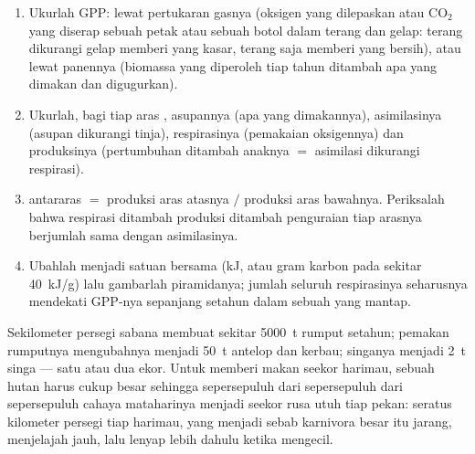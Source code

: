 \begin{method}\label{met:b1:ecosystem-organization:budget}
\begin{enumerate}
  \item Ukurlah GPP: lewat pertukaran gasnya (oksigen yang dilepaskan
        atau $\mathrm{CO_2}$ yang diserap sebuah petak atau sebuah
        botol dalam terang dan gelap: terang dikurangi gelap memberi
        yang kasar, terang saja memberi yang bersih), atau lewat
        panennya (biomassa yang diperoleh tiap tahun ditambah apa yang
        dimakan dan digugurkan).
  \item Ukurlah, bagi tiap aras , asupannya (apa yang
        dimakannya), asimilasinya (asupan dikurangi tinja),
        respirasinya (pemakaian oksigennya) dan produksinya
        (pertumbuhan ditambah anaknya $=$ asimilasi dikurangi
        respirasi).
  \item {} antararas $=$ produksi aras atasnya $/$
        produksi aras bawahnya. Periksalah bahwa respirasi ditambah
        produksi ditambah penguraian tiap arasnya berjumlah sama dengan
        asimilasinya.
  \item Ubahlah menjadi satuan bersama (\unit{kJ}, atau gram karbon
        pada sekitar \qty{40}{kJ/g}) lalu gambarlah piramidanya; jumlah
        seluruh respirasinya seharusnya mendekati GPP-nya sepanjang
        setahun dalam sebuah  yang mantap.
\end{enumerate}
\end{method}

\begin{example}\label{ex:b1:ecosystem-organization:top}
Sekilometer persegi sabana membuat sekitar \qty{5000}{t} rumput
setahun; pemakan rumputnya mengubahnya menjadi \qty{50}{t} antelop dan
kerbau; singanya menjadi \qty{2}{t} singa --- satu atau dua ekor. Untuk
memberi makan seekor harimau, sebuah hutan harus cukup besar sehingga
sepersepuluh dari sepersepuluh dari sepersepuluh cahaya mataharinya
menjadi seekor rusa utuh tiap pekan: seratus kilometer persegi tiap
harimau, yang menjadi sebab karnivora besar itu jarang, menjelajah
jauh, lalu lenyap lebih dahulu ketika  mengecil.
\end{example}

